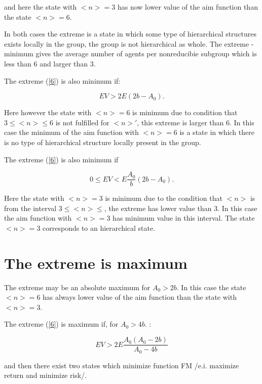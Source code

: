 \documentclass[10pt]{article}
\begin{document}
and here the state with $<n> = 3$ has now lower value of the aim function than the state $<n> = 6$.


In both cases the extreme is a state in which some type of hierarchical structures exists locally in the group, the group is not hierarchical as whole.
The extreme - minimum gives the average number of agents per nonreducibie subgroup which is less than 6 and larger than 3.

The extreme (\ref{6}) is also minimum if:

\begin{equation}
\label{7.2}
EV > 2E(2b - A_{0}).
\end{equation}

Here however the state with $<n> = 6$ is minimum due to condition that $3  \leq <n> \leq  6$ is not fulfilled for $<n>'$, this extreme is larger than 6.
In this case the minimum of the aim function with $<n> = 6$ is a state in which there is no type of hierarchical structure locally present in the group.

The extreme (\ref{6}) is also minimum if 

\begin{equation}
\label{7.3}
0 \leq EV < E \frac{A_{0}}{b} (2b - A_{0}).
\end{equation}

Here the state with $ <n> = 3 $ is minimum due to the condition that $ <n> $ is from the interval $ 3 \leq <n> \leq $, the extreme has lower value than 3. In this case the aim function with $ <n> = 3 $ has minimum value in this interval. The state $ <n> = 3 $ corresponds to an hierarchical state.




\section{The extreme is maximum}

The extreme may be an absolute maximum for $A_{0} > 2b$. In this case the state $<n> = 6$ has always lower value of the aim function than the state with $<n> = 3$.


The extreme (\ref{6}) is maximum if, for $A_{0} > 4b$. :

\begin{equation}
\label{8}
EV > 2E \frac{A_{0}(A_{0}-2b)}{A_{0}-4b}
\end{equation}

and then there exist two states which minimize function FM /e.i. maximize return and minimize risk/.
\end{document}
